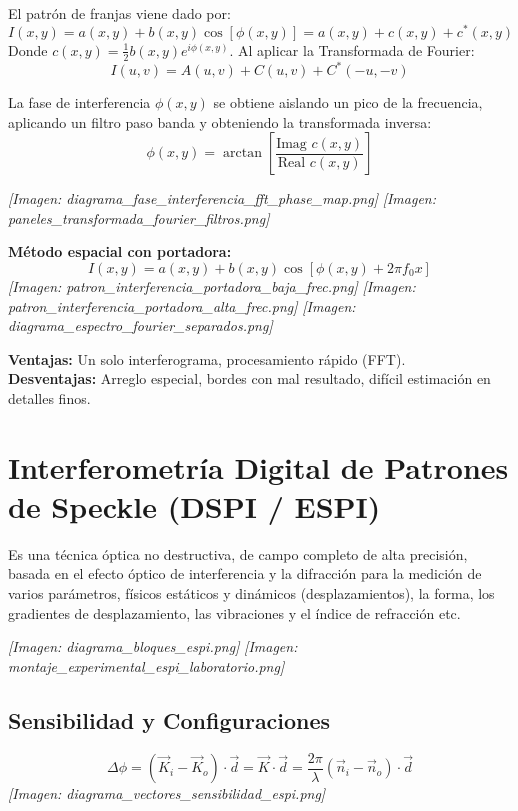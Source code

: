 \documentclass[12pt]{article}
\begin{document}
	El patrón de franjas viene dado por:
	\begin{equation*}
		I(x,y) = a(x,y) + b(x,y)\cos[\phi(x,y)] = a(x,y) + c(x,y) + c^*(x,y)
	\end{equation*}
	Donde $c(x,y) = \frac{1}{2}b(x,y)e^{i\phi(x,y)}$. Al aplicar la Transformada de Fourier:
	\begin{equation*}
		I(u,v) = A(u,v) + C(u,v) + C^*(-u,-v)
	\end{equation*}
	
	La fase de interferencia $\phi(x, y)$ se obtiene aislando un pico de la frecuencia, aplicando un filtro paso banda y obteniendo la transformada inversa:
	\begin{equation*}
		\phi(x, y) = \arctan \left[ \frac{\text{Imag } c(x,y)}{\text{Real } c(x,y)} \right]
	\end{equation*}
	
	\textit{[Imagen: diagrama\_fase\_interferencia\_fft\_phase\_map.png]}
	\textit{[Imagen: paneles\_transformada\_fourier\_filtros.png]}
	
	\textbf{Método espacial con portadora:}
	\begin{equation*}
		I(x,y) = a(x,y) + b(x,y) \cos[\phi(x,y) + 2\pi f_0 x]
	\end{equation*}
	\textit{[Imagen: patron\_interferencia\_portadora\_baja\_frec.png]}
	\textit{[Imagen: patron\_interferencia\_portadora\_alta\_frec.png]}
	\textit{[Imagen: diagrama\_espectro\_fourier\_separados.png]}
	
	\textbf{Ventajas:} Un solo interferograma, procesamiento rápido (FFT). \\
	\textbf{Desventajas:} Arreglo especial, bordes con mal resultado, difícil estimación en detalles finos.
	
	\section{Interferometría Digital de Patrones de Speckle (DSPI / ESPI)}
	Es una técnica óptica no destructiva, de campo completo de alta precisión, basada en el efecto óptico de interferencia y la difracción para la medición de varios parámetros, físicos estáticos y dinámicos (desplazamientos), la forma, los gradientes de desplazamiento, las vibraciones y el índice de refracción etc.
	
	\textit{[Imagen: diagrama\_bloques\_espi.png]}
	\textit{[Imagen: montaje\_experimental\_espi\_laboratorio.png]}
	
	\subsection{Sensibilidad y Configuraciones}
	\begin{equation*}
		\Delta\phi = (\vec{K}_i - \vec{K}_o)\cdot\vec{d} = \vec{K}\cdot\vec{d} = \frac{2\pi}{\lambda}(\vec{n}_i - \vec{n}_o)\cdot\vec{d}
	\end{equation*}
	\textit{[Imagen: diagrama\_vectores\_sensibilidad\_espi.png]}
	
\end{document}

